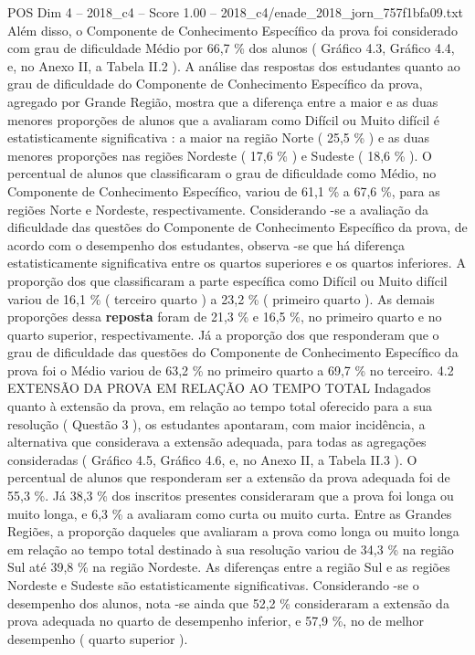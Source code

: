 \begin{textsample}{POS Dim 4 – 2018\_c4 – Score 1.00 – 2018\_c4/enade\_2018\_jorn\_757f1bfa09.txt}
Além disso, o Componente de Conhecimento Específico da prova foi considerado com grau de dificuldade Médio por 66,7 \% dos alunos ( Gráfico 4.3, Gráfico 4.4, e, no Anexo II, a Tabela II.2 ).
A análise das respostas dos estudantes quanto ao grau de dificuldade do Componente de Conhecimento Específico da prova, agregado por Grande Região, mostra que a diferença entre a maior e as duas menores proporções de alunos que a avaliaram como Difícil ou Muito difícil é estatisticamente significativa : a maior na região Norte ( 25,5 \% ) e as duas menores proporções nas regiões Nordeste ( 17,6 \% ) e Sudeste ( 18,6 \% ).
O percentual de alunos que classificaram o grau de dificuldade como Médio, no Componente de Conhecimento Específico, variou de 61,1 \% a 67,6 \%, para as regiões Norte e Nordeste, respectivamente.
Considerando -se a avaliação da dificuldade das questões do Componente de Conhecimento Específico da prova, de acordo com o desempenho dos estudantes, observa -se que há diferença estatisticamente significativa entre os quartos superiores e os quartos inferiores.
A proporção dos que classificaram a parte específica como Difícil ou Muito difícil variou de 16,1 \% ( terceiro quarto ) a 23,2 \% ( primeiro quarto ).
As demais proporções dessa \textbf{reposta} foram de 21,3 \% e 16,5 \%, no primeiro quarto e no quarto superior, respectivamente.
Já a proporção dos que responderam que o grau de dificuldade das questões do Componente de Conhecimento Específico da prova foi o Médio variou de 63,2 \% no primeiro quarto a 69,7 \% no terceiro. 4.2 EXTENSÃO DA PROVA EM RELAÇÃO AO TEMPO TOTAL Indagados quanto à extensão da prova, em relação ao tempo total oferecido para a sua resolução ( Questão 3 ), os estudantes apontaram, com maior incidência, a alternativa que considerava a extensão adequada, para todas as agregações consideradas ( Gráfico 4.5, Gráfico 4.6, e, no Anexo II, a Tabela II.3 ).
O percentual de alunos que responderam ser a extensão da prova adequada foi de 55,3 \%.
Já 38,3 \% dos inscritos presentes consideraram que a prova foi longa ou muito longa, e 6,3 \% a avaliaram como curta ou muito curta.
Entre as Grandes Regiões, a proporção daqueles que avaliaram a prova como longa ou muito longa em relação ao tempo total destinado à sua resolução variou de 34,3 \% na região Sul até 39,8 \% na região Nordeste.
As diferenças entre a região Sul e as regiões Nordeste e Sudeste são estatisticamente significativas.
Considerando -se o desempenho dos alunos, nota -se ainda que 52,2 \% consideraram a extensão da prova adequada no quarto de desempenho inferior, e 57,9 \%, no de melhor desempenho ( quarto superior ).

\end{textsample}
